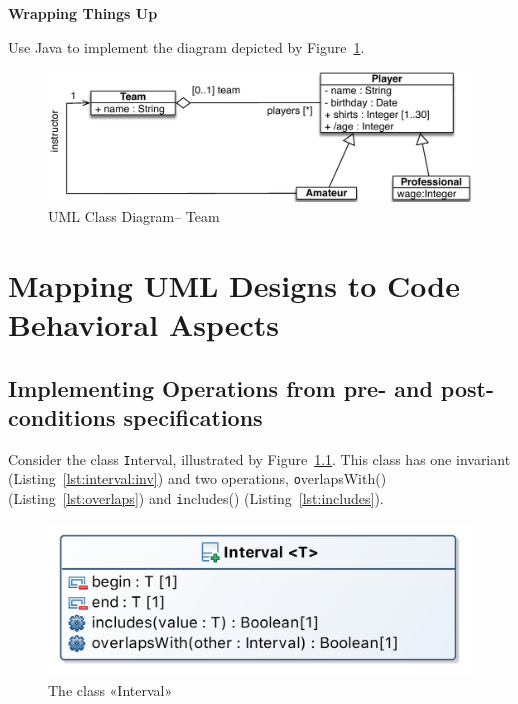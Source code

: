 \documentclass[a4paper,11pt]{memoir}
\newcommand{\code}[1]{{\texttt #1}}
\begin{document}
\begin{solution}
		\lstset{language=Java}
		
			
\end{solution}

\begin{exercise}
	\textbf{Wrapping Things Up}
	
	Use Java to implement the diagram depicted by Figure~\ref{fig:team}.

	\begin{figure}[htbp]
		\centering
			\includegraphics[width=.8\linewidth]{Team}
		\caption{UML Class Diagram\--- Team}
		\label{fig:team}
	\end{figure}
	
\end{exercise}

\chapter{Mapping UML Designs to Code \\ Behavioral Aspects}

\section{Implementing Operations from pre- and post-conditions specifications}

	Consider the class \code{Interval}, illustrated by Figure~\ref{fig:interval}.
	This class has one invariant (Listing~\ref{lst:interval:inv}) and two operations,
	\code{overlapsWith()} (Listing~\ref{lst:overlaps}) and \code{includes()} (Listing~\ref{lst:includes}).

\begin{figure}[htbp]
	\centering
		\includegraphics[width=.4\linewidth]{Interval.png}
	\caption{The class «Interval»}
	\label{fig:interval}
\end{figure}
\end{document}
